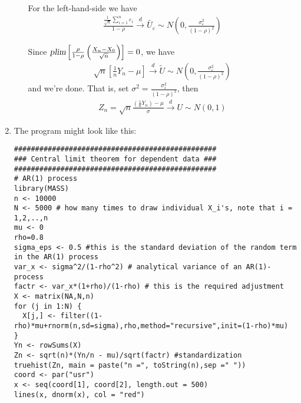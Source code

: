 \begin{Solution}{9.4}
\begin{enumerate}
\begin{enumerate}
        For the left-hand-side we have
        \begin{align*}
        \frac{\frac{1}{\sqrt{n}} \sum_{i=1}^n \varepsilon_i}{1-\rho} \overset{d}{\rightarrow} \tilde{U_\varepsilon} \sim N\left(0,\frac{\sigma_\varepsilon^2}{(1-\rho)^2}\right)
        \end{align*}

        Since $\textsl{plim}\left[\frac{\rho}{1-\rho}\left(\frac{X_n - X_0}{\sqrt{n}}\right)\right] = 0$, we have
        \begin{align*}
        \sqrt{n}\left[\frac{1}{n}Y_n-\mu\right] \overset{d}{\rightarrow} \tilde{U} \sim N\left(0,\frac{\sigma_\varepsilon^2}{(1-\rho)^2}\right)
        \end{align*}
        and we're done. That is, set $\sigma^2 = \frac{\sigma_\varepsilon^2}{(1-\rho)^2}$, then
        \begin{align*}
        Z_n = \sqrt{n}\frac{\left(\frac{1}{n}Y_n\right)-\mu}{\sigma} \overset{d}{\rightarrow} U \sim N(0,1)
        \end{align*}
  \end{enumerate}
  \item The program might look like this:

\begin{verbatim}
################################################
### Central limit theorem for dependent data ###
################################################
# AR(1) process
library(MASS)
n <- 10000
N <- 5000 # how many times to draw individual X_i's, note that i = 1,2,..,n
mu <- 0
rho=0.8
sigma_eps <- 0.5 #this is the standard deviation of the random term in the AR(1) process
var_x <- sigma^2/(1-rho^2) # analytical variance of an AR(1)-process
factr <- var_x*(1+rho)/(1-rho) # this is the required adjustment
X <- matrix(NA,N,n)
for (j in 1:N) {
  X[j,] <- filter((1-rho)*mu+rnorm(n,sd=sigma),rho,method="recursive",init=(1-rho)*mu)
}
Yn <- rowSums(X)
Zn <- sqrt(n)*(Yn/n - mu)/sqrt(factr) #standardization
truehist(Zn, main = paste("n =", toString(n),sep =" "))
coord <- par("usr")
x <- seq(coord[1], coord[2], length.out = 500)
lines(x, dnorm(x), col = "red")
\end{verbatim}
\end{enumerate}



\end{Solution}
